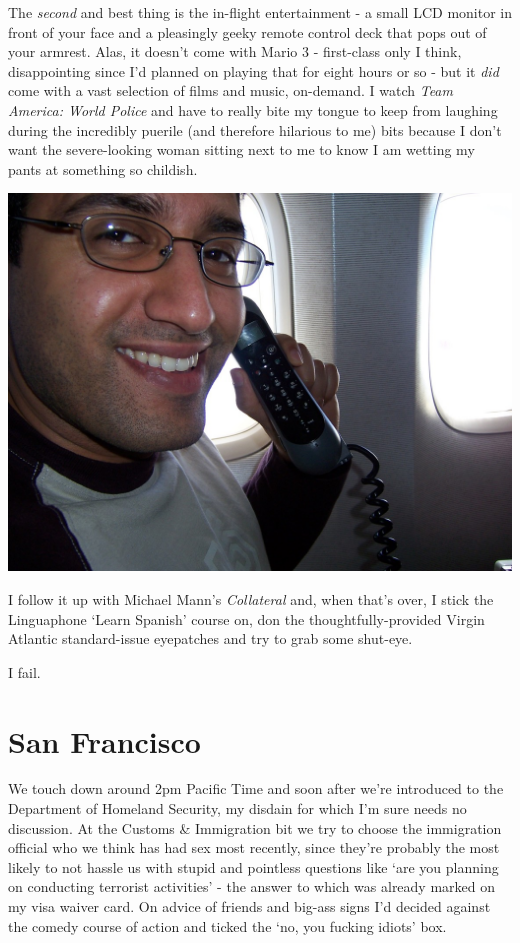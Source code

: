 \documentclass[a5paper,titlepage,11pt]{book}
\begin{document}
The \emph{second} and best thing is the in-flight entertainment - a small LCD monitor in front of your face and a pleasingly geeky remote control deck that pops out of your armrest.  Alas, it doesn't come with Mario 3 - first-class only I think, disappointing since I'd planned on playing that for eight hours or so - but it \emph{did} come with a vast selection of films and music, on-demand.  I watch \emph{Team America: World Police} and have to really bite my tongue to keep from laughing during the incredibly puerile (and therefore hilarious to me) bits because I don't want the severe-looking woman sitting next to me to know I am wetting my pants at something so childish.

\begin{center}\includegraphics[width=\textwidth]{gfx/100_0991}\end{center}

I follow it up with Michael Mann's \emph{Collateral} and, when that's over, I stick the Linguaphone `Learn Spanish' course on, don the thoughtfully-provided Virgin Atlantic standard-issue eyepatches and try to grab some shut-eye.

I fail.

\section*{San Francisco}
We touch down around 2pm Pacific Time and soon after we're introduced to the Department of Homeland Security, my disdain for which I'm sure needs no discussion.  At the Customs \& Immigration bit we try to choose the immigration official who we think has had sex most recently, since they're probably the most likely to not hassle us with stupid and pointless questions like `are you planning on conducting terrorist activities' - the answer to which was already marked on my visa waiver card.  On advice of friends and big-ass signs I'd decided against the comedy course of action and ticked the `no, you fucking idiots' box.
\end{document}
